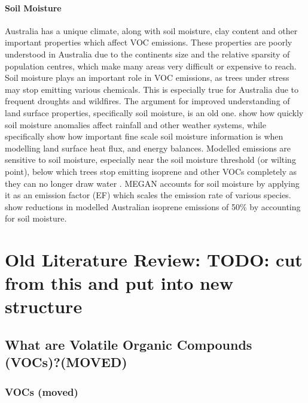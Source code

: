     \subsubsection{Soil Moisture}
      \label{LR:sec:ModelUncertaintySoilMoisture}
      Australia has a unique climate, along with soil moisture, clay content and other important properties which affect VOC emissions.
      These properties are poorly understood in Australia due to the continents size and the relative sparsity of population centres, which make many areas very difficult or expensive to reach.
      Soil moisture plays an important role in VOC emissions, as trees under stress may stop emitting various chemicals. 
      This is especially true for Australia due to frequent droughts and wildfires.
      The argument for improved understanding of land surface properties, specifically soil moisture, is an old one\citep{Mintz1982, Rowntree1983, Chen2001}. 
      \cite{Rowntree1983} show how quickly soil moisture anomalies affect rainfall and other weather systems, while \cite{Chen2001} specifically show how important fine scale soil moisture information is when modelling land surface heat flux, and energy balances.
      Modelled emissions are sensitive to soil moisture, especially near the soil moisture threshold (or wilting point), below which trees stop emitting isoprene and other VOCs completely as they can no longer draw water \citep{Bauwens2016}.
      MEGAN accounts for soil moisture by applying it as an emission factor (EF) which scales the emission rate of various species.
      \citet{Sindelarova2014} show reductions in modelled Australian isoprene emissions of 50\% by accounting for soil moisture. 


\chapter{Old Literature Review: TODO: cut from this and put into new structure}
\section{What are Volatile Organic Compounds (VOCs)?(MOVED)}
\label{ch_LitRev:sec:what_are_vocs}
  \subsection{VOCs (moved)}
